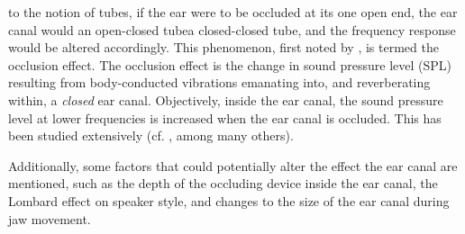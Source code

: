 \DIFdelbegin {}\DIFdelend \DIFaddbegin {}\DIFaddend to the notion of tubes, if the ear were to be occluded at its one open end, the ear canal would \DIFdelbegin {}\DIFdelend \DIFaddbegin {}\DIFaddend an open-closed tube\DIFdelbegin {}\DIFdelend \DIFaddbegin {}\DIFaddend a closed-closed tube, and the frequency response would be altered accordingly.  This phenomenon, first noted by \cite{wheatstone:79}, is termed the occlusion effect\DIFdelbegin {}\DIFdelend .  The occlusion effect \DIFdelbegin {}\DIFdelend is the change in sound pressure level (SPL) resulting from body-conducted vibrations emanating into, and reverberating within, a \textit{closed} ear canal.  Objectively, inside the ear canal, the sound pressure level at lower frequencies is increased when the ear canal is occluded.  This has been studied extensively (cf. \cite{wheatstone:79,kelly:37,littler:52,tonndorf:66}, among many others).  %

\DIFdelbegin {}\DIFdelend Additionally, some factors that could potentially alter the effect \DIFdelbegin {}\DIFdelend \DIFaddbegin {}\DIFaddend the ear canal are mentioned, such as the depth of the occluding device inside the ear canal, the Lombard effect on speaker style, and changes to the size of the ear canal during jaw movement.

\DIFaddbegin {}

